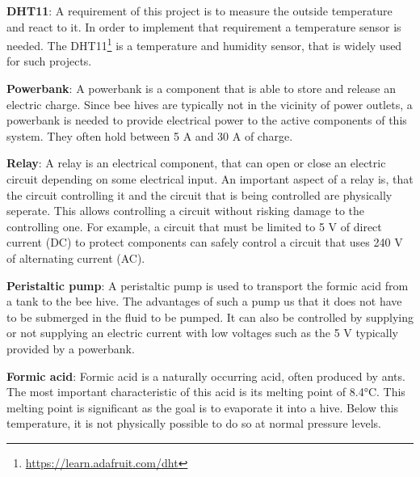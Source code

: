 \textbf{DHT11}: A requirement of this project is to measure the outside temperature and react to it.
In order to implement that requirement a temperature sensor is needed.
The DHT11\footnote{\url{https://learn.adafruit.com/dht}} is a temperature and humidity sensor, that is widely used for such projects.

\textbf{Powerbank}: A powerbank is a component that is able to store and release an electric charge.
Since bee hives are typically not in the vicinity of power outlets, a powerbank is needed to provide electrical power to the active components of this system.
They often hold between 5 A and 30 A of charge.

\textbf{Relay}: A relay is an electrical component, that can open or close an electric circuit depending on some electrical input.
An important aspect of a relay is, that the circuit controlling it and the circuit that is being controlled are physically seperate.
This allows controlling a circuit without risking damage to the controlling one.
For example, a circuit that must be limited to 5 V of direct current (DC) to protect components can safely control a circuit that uses 240 V of alternating current (AC).

\textbf{Peristaltic pump}: A peristaltic pump is used to transport the formic acid from a tank to the bee hive.
The advantages of such a pump us that it does not have to be submerged in the fluid to be pumped.
It can also be controlled by supplying or not supplying an electric current with low voltages such as the 5 V typically provided by a powerbank.

\textbf{Formic acid}: Formic acid is a naturally occurring acid, often produced by ants.
The most important characteristic of this acid is its melting point of 8.4°C\cite{FormicAcid}.
This melting point is significant as the goal is to evaporate it into a hive.
Below this temperature, it is not physically possible to do so at normal pressure levels.